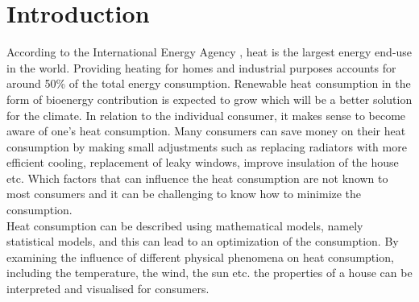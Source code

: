 \chapter{Introduction}
\noindent According to the International Energy Agency \cite{iea}, heat is the largest energy end-use in the world. Providing heating for homes and industrial purposes accounts for around 50\% of the total energy consumption. Renewable heat consumption in the form of bioenergy contribution is expected to grow which will be a better solution for the climate. In relation to the individual consumer, it makes sense to become aware of one's heat consumption. Many consumers can save money on their heat consumption by making small adjustments such as replacing radiators with more efficient cooling, replacement of leaky windows, improve insulation of the house etc. Which factors that can influence the heat consumption are not known to most consumers and it can be challenging to know how to minimize the consumption. \\

\noindent Heat consumption can be described using mathematical models, namely statistical models, and this can lead to an optimization of the consumption. 
By examining the influence of different physical phenomena on heat consumption, including the temperature, the wind, the sun etc. the properties of a house can be interpreted and visualised for consumers.

